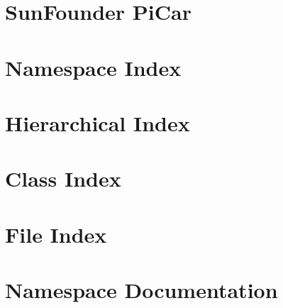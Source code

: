 \documentclass[twoside]{book}
\newcommand{\+}{\discretionary{\mbox{\scriptsize$\hookleftarrow$}}{}{}}
\begin{document}
\chapter{Sun\+Founder Pi\+Car}
\label{md_src_picar__module__sun_founder__pi_car__r_e_a_d_m_e}

\chapter{Namespace Index}

\chapter{Hierarchical Index}

\chapter{Class Index}

\chapter{File Index}

\chapter{Namespace Documentation}















\end{document}

